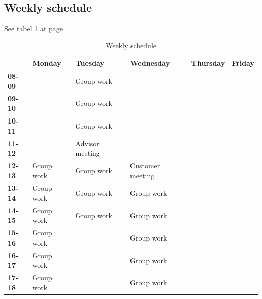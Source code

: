 \subsection{Weekly schedule}
See tabel \ref{tab:weeklyschedule} at page \pageref{tab:weeklyschedule}
\begin{table}
\begin{tabular}{l|l|l|l|l|l}
 & \textbf{Monday} & \textbf{Tuesday} & \textbf{Wednesday} & \textbf{Thursday} & \textbf{Friday} \\ \hline \hline
\textbf{08-09} &  & Group work &  &  &  \\ \hline
\textbf{09-10} &  & Group work &  &  &  \\ \hline
\textbf{10-11} &  & Group work &  &  &  \\ \hline
\textbf{11-12} &  & Advisor meeting & &  &  \\ \hline
\textbf{12-13} & Group work & Group work & Customer meeting &  &  \\ \hline
\textbf{13-14} & Group work & Group work & Group work &  &  \\ \hline
\textbf{14-15} & Group work & Group work & Group work &  &  \\ \hline
\textbf{15-16} & Group work &  & Group work &  &  \\ \hline
\textbf{16-17} & Group work &  & Group work &  &  \\ \hline
\textbf{17-18} & Group work &  & Group work &  & 
\end{tabular}
\caption {Weekly schedule} \label{tab:weeklyschedule}
\end{table}

